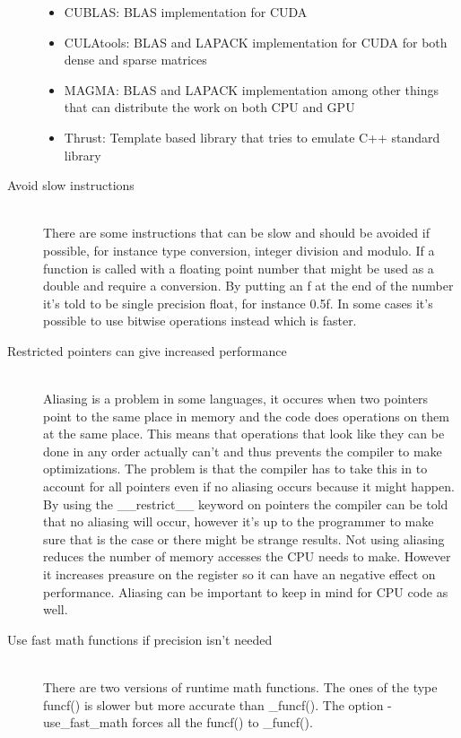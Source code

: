 \documentclass[10pt,a4paper]{article}
\begin{document}
\begin{description}
  \begin{itemize}
    \item CUBLAS: BLAS implementation for CUDA\cite{cublas}
    \item CULAtools: BLAS and LAPACK implementation for CUDA for both dense and sparse matrices\cite{culatools}
    \item MAGMA: BLAS and LAPACK implementation among other things that can distribute the work on both CPU and GPU\cite{magma_2010}
    \item Thrust: Template based library that tries to emulate C++ standard library\cite{thrust_gpu}
  \end{itemize}
  \item[Avoid slow instructions] \hfill \\
  There are some instructions that can be slow and should be avoided if possible, for instance type conversion, integer division and modulo. If a function is called with a floating point number that might be used as a double and require a conversion. By putting an f at the end of the number it's told to be single precision float, for instance 0.5f. In some cases it's possible to use bitwise operations instead which is faster.\cite{cuda, cuda_best_practice}
  \item[Restricted pointers can give increased performance] \hfill \\
  Aliasing is a problem in some languages, it occures when two pointers point to the same place in memory and the code does operations on them at the same place. This means that operations that look like they can be done in any order actually can't and thus prevents the compiler to make optimizations. The problem is that the compiler has to take this in to account for all pointers even if no aliasing occurs because it might happen. By using the \_\_restrict\_\_ keyword on pointers the compiler can be told that no aliasing will occur, however it's up to the programmer to make sure that is the case or there might be strange results. Not using aliasing reduces the number of memory accesses the CPU needs to make. However it increases preasure on the register so it can have an negative effect on performance.\cite{cuda} Aliasing can be important to keep in mind for CPU code as well\cite{drepper2007cpumemory}.
  \item[Use fast math functions if precision isn't needed] \hfill \\
  There are two versions of runtime math functions. The ones of the type funcf() is slower but more accurate than \_funcf(). The option -use\_fast\_math forces all the funcf() to \_funcf().\cite{cuda_best_practice}
\end{description}
\end{document}
